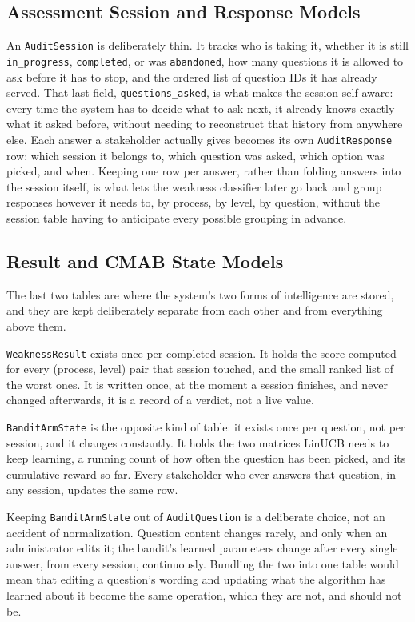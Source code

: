 \documentclass[a4paper, 12pt, oneside, openany, BCOR1cm,toc=chapterentrywithdots]{scrbook}
\begin{document}
\subsection{Assessment Session and Response Models}

An \texttt{AuditSession} is deliberately thin. It tracks who is taking it, whether it is still
\texttt{in\_progress}, \texttt{completed}, or was \texttt{abandoned}, how many questions it is
allowed to ask before it has to stop, and the ordered list of question IDs it has already served.
That last field, \texttt{questions\_asked}, is what makes the session self-aware: every time the
system has to decide what to ask next, it already knows exactly what it asked before, without
needing to reconstruct that history from anywhere else. Each answer a stakeholder actually gives
becomes its own \texttt{AuditResponse} row: which session it belongs to, which question was
asked, which option was picked, and when. Keeping one row per answer, rather than folding
answers into the session itself, is what lets the weakness classifier later go back and group
responses however it needs to, by process, by level, by question, without the session table
having to anticipate every possible grouping in advance.

\subsection{Result and CMAB State Models}
\label{sec:result-cmab-models}

The last two tables are where the system's two forms of intelligence are stored, and they are
kept deliberately separate from each other and from everything above them.

\texttt{WeaknessResult} exists once per completed session. It holds the score computed for every
(process, level) pair that session touched, and the small ranked list of the worst ones. It is
written once, at the moment a session finishes, and never changed afterwards, it is a record of a
verdict, not a live value.

\texttt{BanditArmState} is the opposite kind of table: it exists once per question, not per
session, and it changes constantly. It holds the two matrices LinUCB needs to keep learning, a
running count of how often the question has been picked, and its cumulative reward so far. Every
stakeholder who ever answers that question, in any session, updates the same row.

Keeping \texttt{BanditArmState} out of \texttt{AuditQuestion} is a deliberate choice, not an
accident of normalization. Question content changes rarely, and only when an administrator edits
it; the bandit's learned parameters change after every single answer, from every session,
continuously. Bundling the two into one table would mean that editing a question's wording and
updating what the algorithm has learned about it become the same operation, which they are not,
and should not be.
\end{document}
